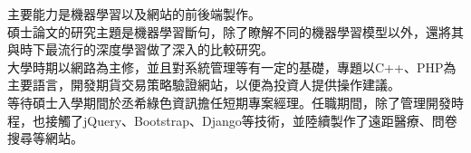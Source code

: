 


主要能力是機器學習以及網站的前後端製作。\\
碩士論文的研究主題是機器學習斷句，除了瞭解不同的機器學習模型以外，還將其與時下最流行的深度學習做了深入的比較研究。\\
大學時期以網路為主修，並且對系統管理等有一定的基礎，專題以C++、PHP為主要語言，開發期貨交易策略驗證網站，以便為投資人提供操作建議。\\
等待碩士入學期間於丞希綠色資訊擔任短期專案經理。任職期間，除了管理開發時程，也接觸了jQuery、Bootstrap、Django等技術，並陸續製作了遠距醫療、問卷搜尋等網站。

